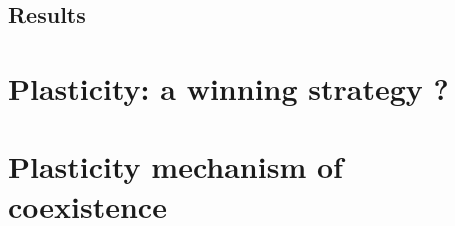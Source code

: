 \section{Results}

\chapter{Plasticity: a winning strategy ?}

\chapter{Plasticity mechanism of coexistence}